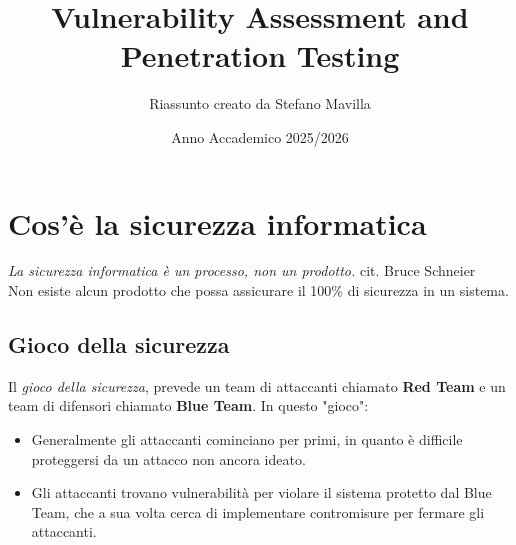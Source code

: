 \documentclass{article}
\title{Vulnerability Assessment and Penetration Testing}
\author{Riassunto creato da Stefano Mavilla}
\date{Anno Accademico 2025/2026}
\begin{document}
\maketitle

\section{Cos'è la sicurezza informatica}
\textit{La sicurezza informatica è un processo, non un prodotto.} cit. Bruce Schneier\\
Non esiste alcun prodotto che possa assicurare il 100\% di sicurezza in un sistema.

\subsection{Gioco della sicurezza}
Il \textit{gioco della sicurezza}, prevede un team di attaccanti chiamato \textbf{Red Team} e un team di difensori chiamato \textbf{Blue Team}. In questo "gioco":
\begin{itemize}
    \item Generalmente gli attaccanti cominciano per primi, in quanto è difficile proteggersi da un attacco non ancora ideato.
    \item Gli attaccanti trovano vulnerabilità per violare il sistema protetto dal Blue Team, che a sua volta cerca di implementare contromisure per fermare gli attaccanti.
\end{itemize}
\end{document}
